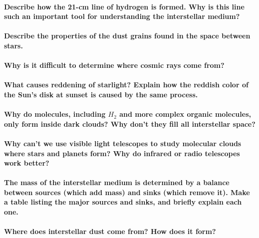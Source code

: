 \documentclass{tufte-handout}
\begin{document}
\paragraph{Describe how the 21-cm line of hydrogen is formed. Why is this line such an important tool for
understanding the interstellar medium?}

\paragraph{Describe the properties of the dust grains found in the space between stars.}

\paragraph{Why is it difficult to determine where cosmic rays come from?}

\paragraph{What causes reddening of starlight? Explain how the reddish color of the Sun’s disk at sunset is caused by
the same process.}

\paragraph{Why do molecules, including $H_2$ and more complex organic molecules, only form inside dark clouds? Why
don’t they fill all interstellar space?}

\paragraph{Why can't we use visible light telescopes to study molecular clouds where stars and planets form? Why do
infrared or radio telescopes work better?}

\paragraph{The mass of the interstellar medium is determined by a balance between sources (which add mass) and
sinks (which remove it). Make a table listing the major sources and sinks, and briefly explain each one.}

\paragraph{Where does interstellar dust come from? How does it form?}
\end{document}

